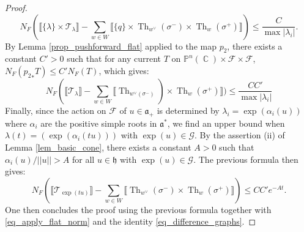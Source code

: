 \documentclass[12pt]{amsbook}%
\theoremstyle{definition}
\theoremstyle{remark}
\numberwithin{section}{chapter}
\numberwithin{subsection}{section}
\numberwithin{figure}{chapter}
\DeclareMathOperator{\C}{\mathbb{C}}
\DeclareMathOperator{\Th}{Th}
\newcommand\intcur[1]{\llbracket #1 \rrbracket}
\def\bP{{\mathbb{P}}}
\def\cF{{\mathscr{F}}}
\begin{document}
{{\begin{proof}
\begin{equation*} 
N_F \left  (\intcur{\{\lambda\}\times \mathcal{T}_\lambda} - \sum_{w\in W} \intcur{ \{q \}\times \Th_{w^\vee}(\sigma^-) \times \Th_w(\sigma^+)} \right ) \leqslant \dfrac{C }{\max |\lambda_i|}.
\end{equation*}
By Lemma \ref{prop_pushforward_flat} applied to the map $p_2$, there exists a constant $C'>0$ such that for any current $T$ on $\bP^n(\C) \times \cF \times \cF$, $N_F({p_2}_* T ) \leqslant C' N_F(T)$, which gives: 
\begin{equation*}
	N_F(\intcur{\mathcal{T}_\lambda} - \sum_{w\in W} \intcur{\Th_{w^\vee(\sigma^-)}) \times \Th_{w}(\sigma^+)}) \leqslant \dfrac{C C'}{\max |\lambda_i|}
\end{equation*}
Finally, since  the action on $\cF$ of $u\in \mathfrak{a}_+$ is determined by $\lambda_i = \exp( \alpha_i(u))$ where $\alpha_i$ are the positive simple roots in $\mathfrak{a}^*$,  we find an upper bound when  
 $\lambda(t)= (\exp(\alpha_i(tu)))$ with $ \exp(u) \in \mathcal{G}$. 
 By the assertion (ii) of Lemma \ref{lem_basic_cone}, there exists a constant $A> 0 $ such that $ \alpha_i(u)/ || u ||> A$ for all $u \in \mathfrak{h}$ with $\exp(u) \in \mathcal{G}$. The previous formula then gives: 
 \begin{equation} \label{eq_exp_flatnorm}
 N_F \left ( \intcur{\mathcal{T}_{\exp(tu)}} - \sum_{w\in W} \intcur{\Th_{w^\vee}(\sigma^-) \times \Th_w(\sigma^+)} \right ) \leqslant CC' e^{-A t}.
\end{equation}    
One then concludes the proof using the previous formula together with \eqref{eq_apply_flat_norm} and the identity \eqref{eq_difference_graphs}. 
  \end{proof}

}}
\end{document}
